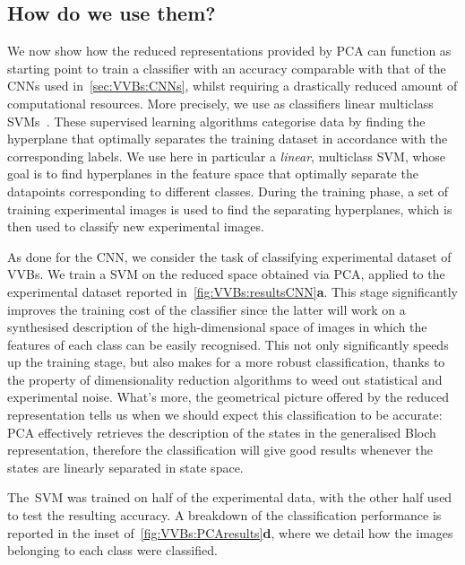 \subsection{How do we use them?}

We now show how the reduced representations provided by \ac{PCA} can function as starting point to train a classifier with an accuracy comparable with that of the \acp{CNN} used in~\cref{sec:VVBs:CNNs}, whilst requiring a drastically reduced amount of computational resources.
More precisely, we use as classifiers linear multiclass \acp{SVM}~\cite{hearst1998support,shawe2000support}. These supervised learning algorithms categorise data by finding the hyperplane that optimally separates the training dataset in accordance with the corresponding labels.
We use here in particular a \emph{linear}, multiclass \ac{SVM}, whose goal is to find hyperplanes in the feature space that optimally separate the datapoints corresponding to different classes.
During the training phase, a set of training experimental images is used to find the separating hyperplanes, which is then used to classify new experimental images.

As done for the \ac{CNN}, we consider the task of classifying experimental dataset of VVBs. We train a \ac{SVM} on the reduced space obtained via \ac{PCA}, applied to the experimental dataset reported in~\cref{fig:VVBs:resultsCNN}\textbf{a}. This stage significantly improves the training cost of the classifier since the latter will work on a synthesised description of the high-dimensional space of images in which the features of each class can be easily recognised.
This not only significantly speeds up the training stage, but also makes for a more robust classification, thanks to the property of dimensionality reduction algorithms to weed out statistical and experimental noise.
What's more, the geometrical picture offered by the reduced representation tells us when we should expect this classification to be accurate: \ac{PCA} effectively retrieves the description of the states in the generalised Bloch representation, therefore the classification will give good results whenever the states are linearly separated in state space.


The~\ac{SVM} was trained on half of the experimental data, with the other half used to test the resulting accuracy. A breakdown of the classification performance is reported in the inset of~\cref{fig:VVBs:PCAresults}\textbf{d}, where we detail how the images belonging to each class were classified.

